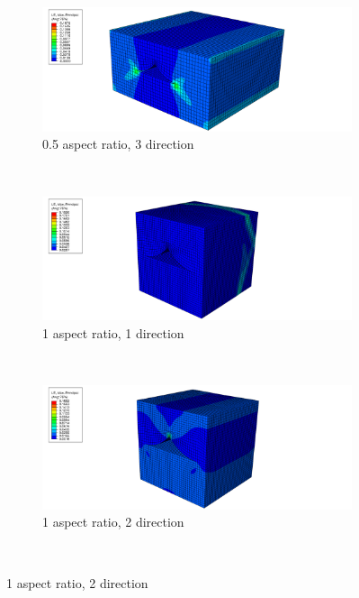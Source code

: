 \begin{figure}
  \begin{subfigure}[b]{0.70\textwidth}
    \includegraphics[width=\textwidth]{chapter_7_non-elasticmodelling/figures/05p3.png}
    \caption{0.5 aspect ratio, 3 direction}
  \end{subfigure}
  \\
    \begin{subfigure}[b]{0.80\textwidth}
    \includegraphics[width=\textwidth]{chapter_7_non-elasticmodelling/figures/1p1.png}
    \caption{1 aspect ratio, 1 direction}
  \end{subfigure}
  \\
    \begin{subfigure}[b]{0.80\textwidth}
    \includegraphics[width=\textwidth]{chapter_7_non-elasticmodelling/figures/1p2.png}
    \caption{1 aspect ratio, 2 direction}
  \end{subfigure}
  \\

\end{figure}
